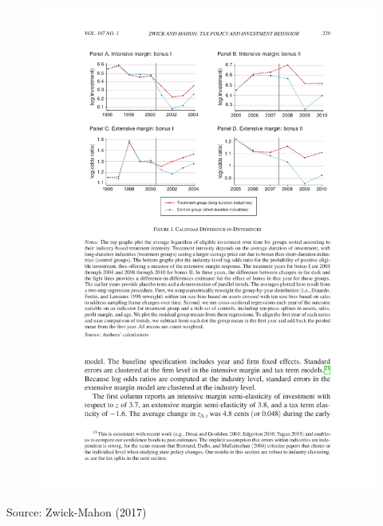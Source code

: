\documentclass[english,xcolor=svgnames,aspectratio=169]{beamer}
\begin{document}
\begin{frame}
\begin{figure}
	\centering
	\includegraphics[height=0.85 \textheight]{figures/ZwickMahon2017Figure1.pdf}
\end{figure}
\vspace{-4mm}
{\scriptsize Source: Zwick-Mahon (2017)}
\end{frame}
\end{document}
